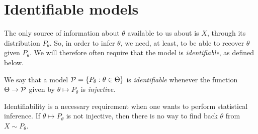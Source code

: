 \section{Identifiable models} %

The only source of information about $\theta$ available to us about is $X$, through its distribution $P_{\theta}$.
So, in order to infer $\theta$, we need, at least, to be able to recover $\theta$ given $P_\theta$.
We will therefore often require that the model is \emph{identifiable}, as defined below.
\begin{definition}
	We say that a model $\operatorname{\mathcal P} = \{ P_\theta : \theta \in \Theta \}$ is \emph{identifiable} whenever the function $\Theta \rightarrow \operatorname{\mathcal P}$ given by $\theta \mapsto P_\theta$
	is \emph{injective}.
\end{definition}
Identifiability is a necessary requirement when one wants to perform statistical inference.
If $\theta \mapsto P_\theta$ is not injective, then there is no way to find back $\theta$ from $X \sim P_\theta$.

